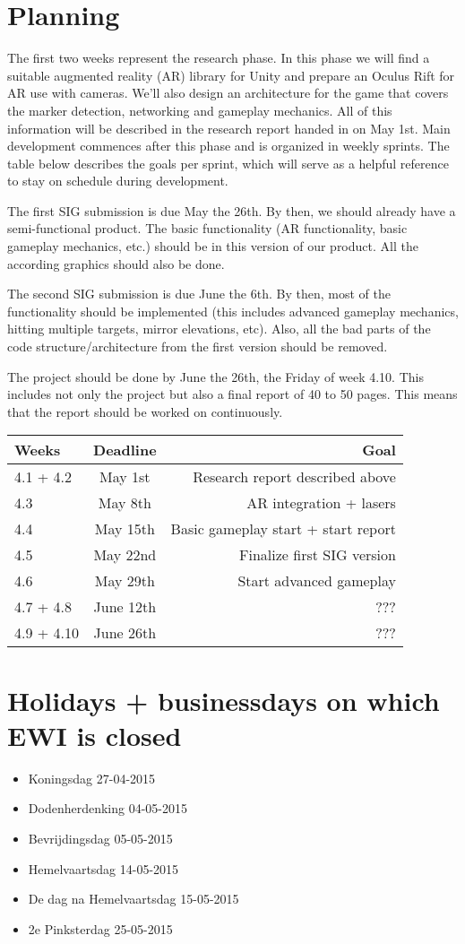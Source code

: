 \section{Planning}

The first two weeks represent the research phase. In this phase we will find a suitable augmented reality (AR) library for Unity and prepare an Oculus Rift for AR use with cameras. We'll also design an architecture for the game that covers the marker detection, networking and gameplay mechanics. All of this information will be described in the research report handed in on May 1st. Main development commences after this phase and is organized in weekly sprints. The table below describes the goals per sprint, which will serve as a helpful reference to stay on schedule during development.

The first SIG submission is due May the 26th. By then, we should already have a semi-functional product. The basic functionality (AR functionality, basic gameplay mechanics, etc.) should be in this version of our product. All the according graphics should also be done.

The second SIG submission is due June the 6th. By then, most of the functionality should be implemented (this includes advanced gameplay mechanics, hitting multiple targets, mirror elevations, etc). Also, all the bad parts of the code structure/architecture from the first version should be removed.

The project should be done by June the 26th, the Friday of week 4.10. This includes not only the project but also a final report of 40 to 50 pages. This means that the report should be worked on continuously.
 
\begin{tabular}{|l|c|r|}
	\hline
	Weeks & Deadline & Goal \\ \hline
	4.1 + 4.2 & May 1st & Research report described above \\ \hline
	4.3 & May 8th & AR integration + lasers \\ \hline
	4.4 & May 15th & Basic gameplay start + start report \\ \hline
	4.5 & May 22nd & Finalize first SIG version \\ \hline
	4.6 & May 29th & Start advanced gameplay \\ \hline
	4.7 + 4.8 & June 12th & ??? \\ \hline
	4.9 + 4.10 & June 26th & ??? \\ \hline
\end{tabular}

\section{Holidays + businessdays on which EWI is closed}
\begin{itemize}
	\item Koningsdag 27-04-2015
	\item Dodenherdenking 04-05-2015
	\item Bevrijdingsdag 05-05-2015
	\item Hemelvaartsdag 14-05-2015
	\item De dag na Hemelvaartsdag 15-05-2015
	\item 2e Pinksterdag 25-05-2015
\end{itemize}